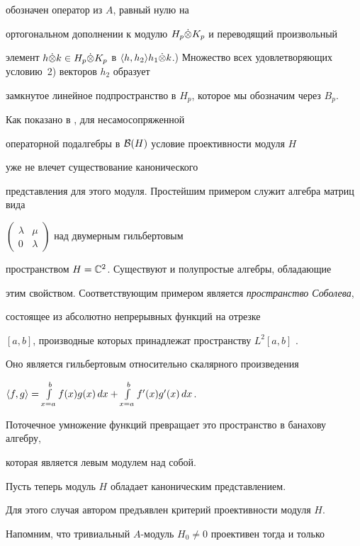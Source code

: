 обозначен оператор из $A$, равный нулю на


ортогональном дополнении к модулю $H_p \Dot \otimes K_p$ и переводящий произвольный


элемент $h \tenp k \in H_p \tenp K_p$ в $\lan h,h_2 \ran h_1 \tenp


k$.) Множество всех удовлетворяющих условию~2) векторов $h_2$ образует


замкнутое линейное подпространство в $H_p$, которое мы обозначим через $B_p$.





Как показано в \cite{Tab}, для несамосопряженной


операторной подалгебры в ${\cal B}(H)$ условие проективности модуля $H$ 


уже не влечет существование канонического 


представления для этого модуля. Простейшим примером служит алгебра матриц вида


$\left(\begin{smallmatrix} \lambda & \mu \\ 0 & \lambda


\end{smallmatrix}\right )$ над двумерным гильбертовым 


пространством $H=\Bbb C^2$. Существуют и полупростые алгебры, обладающие


этим свойством. Соответствующим примером является {\it пространство Соболева},


состоящее из абсолютно непрерывных функций на отрезке


$[a,b]$, производные которых принадлежат пространству $L^2[a,b]$ \cite {Tab}.


Оно является гильбертовым относительно скалярного произведения


$\lan f,g \ran =\int\limits_{x=a}^b f(x)g(x) \, dx


+ \int\limits_{x=a}^b f'(x)g'(x) \, dx$.


Поточечное умножение функций превращает это пространство в банахову алгебру,


которая является левым модулем над собой.





Пусть теперь модуль $H$ обладает каноническим представлением.


Для этого случая автором предъявлен критерий проективности модуля $H$.


Напомним, что тривиальный $A$-модуль $H_0 \ne 0$ проективен тогда и только


